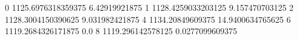 0 1125.6976318359375 6.42919921875
1 1128.4259033203125 9.157470703125
2 1128.3004150390625 9.031982421875
4 1134.20849609375 14.9400634765625
6 1119.2684326171875 0.0
8 1119.296142578125 0.0277099609375

